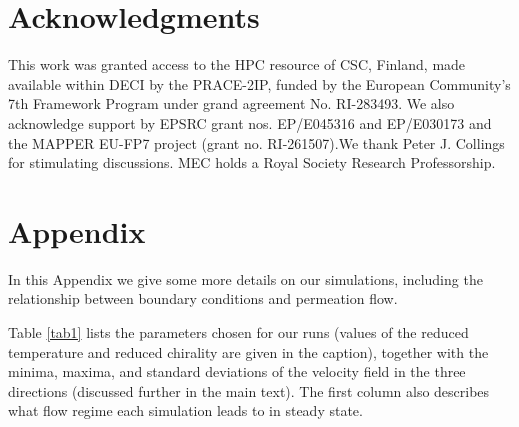 \documentclass[8.5pt,twoside,twocolumn]{article}
\begin{document}



\section*{Acknowledgments}

This work was granted access to the HPC resource of CSC, Finland, made available 
within DECI by the PRACE-2IP, funded by the European Community's 7th Framework 
Program under grand agreement No. RI-283493. We also acknowledge support by 
EPSRC grant nos. EP/E045316 and EP/E030173 and the MAPPER EU-FP7 project 
(grant no. RI-261507).We thank Peter J. Collings for stimulating discussions. 
MEC holds a Royal Society Research Professorship.

\appendix
\section*{Appendix}

In this Appendix we give some more details on our simulations,
including the relationship between boundary conditions and
permeation flow.

Table \ref{tab1} lists the parameters chosen for our runs (values of
the reduced temperature and reduced chirality are given in the caption),
together with the minima, maxima, and standard deviations of the velocity
field in the three directions (discussed further in the main text). 
The first column also describes what flow regime each simulation
leads to in steady state.
\end{document}
